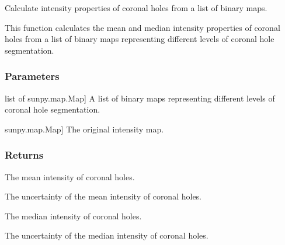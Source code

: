 \documentclass[letterpaper,10pt,english]{sphinxmanual}
\begin{document}

\begin{fulllineitems}
\label{\detokenize{pycatch/utils/ch_mapping:pycatch.utils.ch_mapping.get_intensity}}
\pysigstartsignatures
{}
\pysigstopsignatures
\sphinxAtStartPar
Calculate intensity properties of coronal holes from a list of binary maps.

\sphinxAtStartPar
This function calculates the mean and median intensity properties of coronal holes from a list of binary maps representing different levels of coronal hole segmentation.


\subsubsection{Parameters}
\label{\detokenize{pycatch/utils/ch_mapping:id21}}\begin{description}
\sphinxlineitem{binmaps}{[}list of sunpy.map.Map{]}
\sphinxAtStartPar
A list of binary maps representing different levels of coronal hole segmentation.

\sphinxlineitem{map}{[}sunpy.map.Map{]}
\sphinxAtStartPar
The original intensity map.

\end{description}


\subsubsection{Returns}
\label{\detokenize{pycatch/utils/ch_mapping:id22}}\begin{description}
\sphinxAtStartPar
The mean intensity of coronal holes.

\sphinxAtStartPar
The uncertainty of the mean intensity of coronal holes.

\sphinxAtStartPar
The median intensity of coronal holes.

\sphinxAtStartPar
The uncertainty of the median intensity of coronal holes.

\end{description}

\end{fulllineitems}
\end{document}
